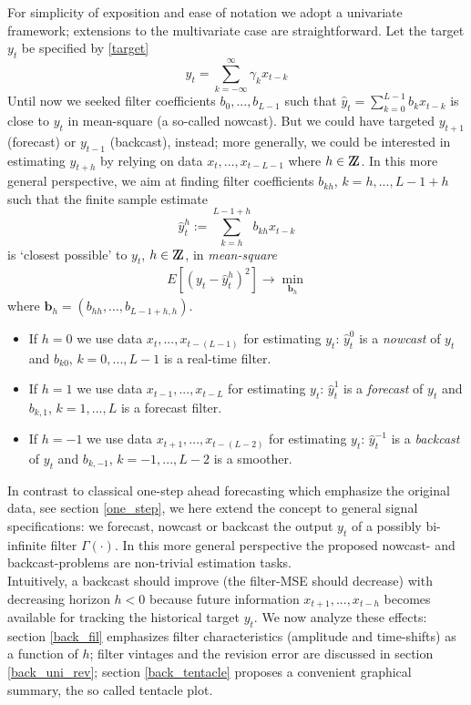 \documentclass[a4paper]{book}
\begin{document}
For simplicity of exposition and ease of notation we adopt a univariate framework; extensions to the multivariate case are straightforward. Let the target $y_t$ be specified by \ref{target}
\[
y_t=\sum_{k=-\infty}^{\infty}\gamma_{k} x_{t-k}
\]
Until now we seeked filter coefficients $b_0,...,b_{L-1}$ such that $\hat{y}_t=\sum_{k=0}^{L-1}b_kx_{t-k}$ is close to $y_t$ in mean-square (a so-called nowcast). But we could have targeted $y_{t+1}$ (forecast) or $y_{t-1}$ (backcast), instead;  more generally, we could be interested in estimating $y_{t+h}$ by relying on data $x_t,...,x_{t-{L-1}}$ where $h\in \mbox{Z\hspace{-.3em}Z}$.  In this more general perspective, we aim at finding filter coefficients $b_{kh}$, $k=h,...,L-1+h$ such that the finite sample
estimate
\begin{equation}\label{filter}
\hat{y}_{t}^{h}:=\sum_{k=h}^{L-1+h}b_{kh}x_{t-k}
\end{equation}
is `closest possible' to $y_{t}$, $h\in \mbox{Z\hspace{-.3em}Z}$, in \emph{mean-square}
\begin{eqnarray*}
E\left[(y_{t}-\hat{y}_{t}^h)^2\right]\to\min_{\mathbf{b}_h}
\end{eqnarray*}
where $\mathbf{b}_h=(b_{hh},...,b_{L-1+h,h})$.
\begin{itemize}
\item If $h=0$ we use data $x_t,...,x_{t-(L-1)}$ for estimating $y_t$: $\hat{y}_t^0$ is a \emph{nowcast} of $y_t$ and $b_{k0}$, $k=0,...,L-1$ is a real-time filter.
\item If $h=1$ we use data $x_{t-1},...,x_{t-L}$ for estimating $y_t$: $\hat{y}_t^1$ is a \emph{forecast} of $y_t$ and $b_{k,1}$, $k=1,...,L$ is a forecast filter.
\item If $h=-1$ we use data $x_{t+1},...,x_{t-(L-2)}$ for estimating $y_t$: $\hat{y}_t^{-1}$ is a \emph{backcast} of $y_t$ and $b_{k,-1}$, $k=-1,...,L-2$ is a smoother.
\end{itemize}
In contrast to classical one-step ahead forecasting which emphasize the original data, see section \ref{one_step}, we here extend the concept to general signal specifications: we forecast, nowcast or backcast the output $y_t$ of a possibly bi-infinite filter $\Gamma(\cdot)$. In this more general perspective the proposed nowcast- and backcast-problems are non-trivial estimation tasks. \\

Intuitively, a backcast should improve (the filter-MSE should decrease) with decreasing horizon $h<0$ because future information $x_{t+1},...,x_{t-h}$ becomes available for tracking the historical target $y_t$. We now analyze these effects: section \ref{back_fil} emphasizes filter characteristics (amplitude and time-shifts) as a function of $h$; filter vintages and the revision error are discussed in section \ref{back_uni_rev}; section \ref{back_tentacle} proposes a convenient graphical summary, the so called tentacle plot.
\end{document}
